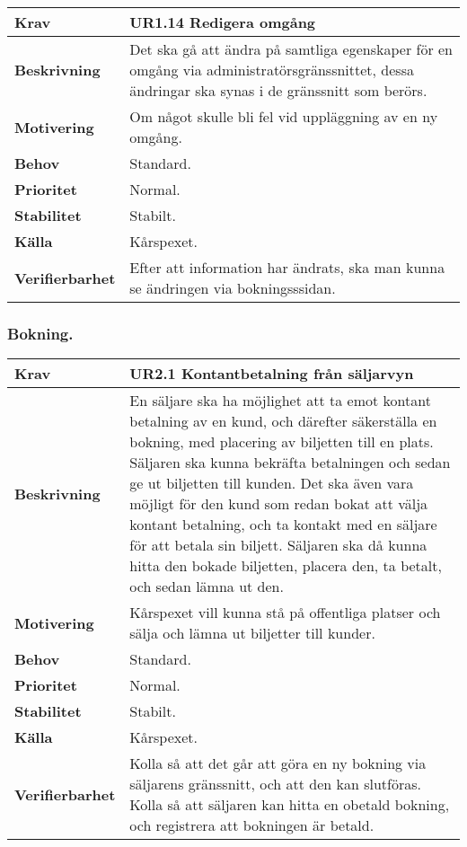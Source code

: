 \documentclass[a4paper, twoside, 11pt, titlepage]{article}
\begin{document}
		\begin{tabular} { p{2.6cm} p{12.5cm} }
			\hline
			\sffamily\textbf{Krav} & \sffamily\textbf{UR1.14 Redigera omgång  } \\
			\hline
			\sffamily\textbf{Beskrivning} & Det ska gå att ändra på samtliga egenskaper för en omgång via administratörsgränssnittet, dessa ändringar ska synas i de gränssnitt som berörs.  \\
			\hline
			\sffamily\textbf{Motivering} & Om något skulle bli fel vid uppläggning av en ny omgång.  \\
			\hline
			\sffamily\textbf{Behov} & Standard.  \\
			\hline
			\sffamily\textbf{Prioritet} & Normal.  \\
			\hline
			\sffamily\textbf{Stabilitet} & Stabilt.  \\
			\hline
			\sffamily\textbf{Källa} & Kårspexet.  \\
			\hline
			\sffamily\textbf{Verifierbarhet} & Efter att information har ändrats, ska man kunna se ändringen via bokningsssidan.  \\
			\hline
		\end{tabular}


		\subsubsection{Bokning.}


		\begin{tabular} { p{2.6cm} p{12.5cm} }
			\hline
			\sffamily\textbf{Krav} & \sffamily\textbf{UR2.1 Kontantbetalning från säljarvyn  } \\
			\hline
			\sffamily\textbf{Beskrivning} & En säljare ska ha möjlighet att ta emot kontant betalning av en kund, och därefter säkerställa en bokning, med placering av biljetten till en plats. Säljaren ska kunna bekräfta betalningen och sedan ge ut biljetten till kunden. Det ska även vara möjligt för den kund som redan bokat att välja kontant betalning, och ta kontakt med en säljare för att betala sin biljett. Säljaren ska då kunna hitta den bokade biljetten, placera den, ta betalt, och sedan lämna ut den.  \\
			\hline
			\sffamily\textbf{Motivering} & Kårspexet vill kunna stå på offentliga platser och sälja och lämna ut biljetter till kunder.  \\
			\hline
			\sffamily\textbf{Behov} & Standard.  \\
			\hline
			\sffamily\textbf{Prioritet} & Normal.  \\
			\hline
			\sffamily\textbf{Stabilitet} & Stabilt.  \\
			\hline
			\sffamily\textbf{Källa} & Kårspexet.  \\
			\hline
			\sffamily\textbf{Verifierbarhet} & Kolla så att det går att göra en ny bokning via säljarens gränssnitt, och att den kan slutföras. Kolla så att säljaren kan hitta en obetald bokning, och registrera att bokningen är betald.  \\
			\hline
		\end{tabular}
		\vspace{6mm}
\end{document}
